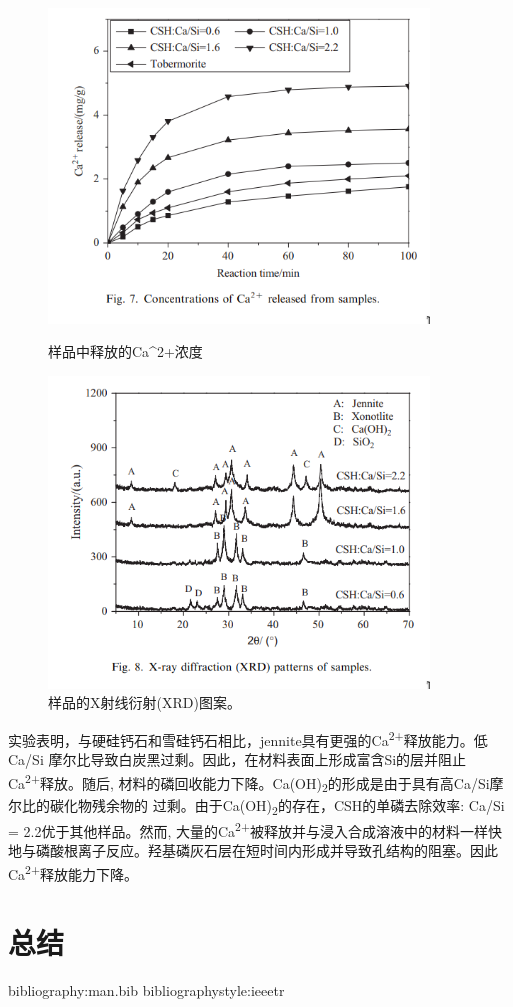 \documentclass[11pt]{article}
\begin{document}
\begin{figure}
    \centering
    \begin{minipage}{0.45\textwidth}
        \centering
        \includegraphics[width=0.9\textwidth]{fig.7.png} %
        \caption{样品中释放的Ca^{2+}浓度}
    \end{minipage}\hfill
    \begin{minipage}{0.45\textwidth}
        \centering
        \includegraphics[width=0.9\textwidth]{fig.8.png} %
        \caption{样品的X射线衍射(XRD)图案。}
    \end{minipage}
\end{figure}

\setlength{\parindent}{1.0cm}
实验表明，与硬硅钙石和雪硅钙石相比，jennite具有更强的Ca\textsuperscript{2+}释放能力。低Ca/Si
摩尔比导致白炭黑过剩。因此，在材料表面上形成富含Si的层并阻止Ca\textsuperscript{2+}释放。随后,
材料的磷回收能力下降。Ca(OH)\textsubscript{2}的形成是由于具有高Ca/Si摩尔比的碳化物残余物的
过剩。由于Ca(OH)\textsubscript{2}的存在，CSH的单磷去除效率: Ca/Si = 2.2优于其他样品。然而,
大量的Ca\textsuperscript{2+}被释放并与浸入合成溶液中的材料一样快地与磷酸根离子反应。羟基磷灰石层在短时间内形成并导致孔结构的阻塞。因此Ca\textsuperscript{2+}释放能力下降。
\par

\section{总结}
\label{sec:orgfe1cc80}

bibliography:man.bib
bibliographystyle:ieeetr
\end{document}
